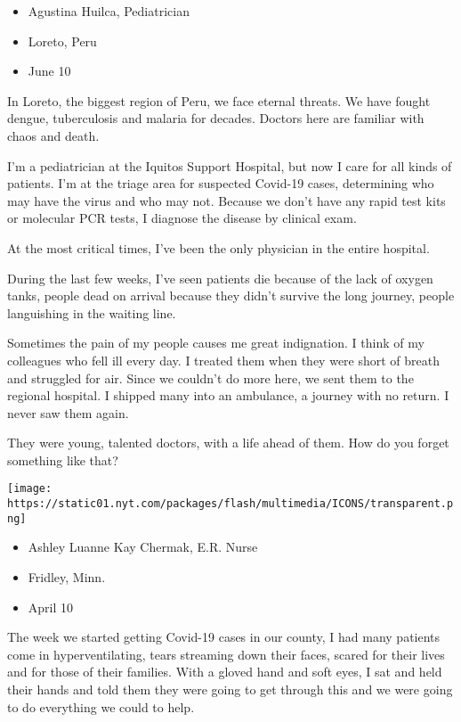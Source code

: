 \begin{itemize}
\tightlist
\item
  Agustina Huilca, Pediatrician
\item
  Loreto, Peru
\item
  June 10
\end{itemize}

In Loreto, the biggest region of Peru, we face eternal threats. We have
fought dengue, tuberculosis and malaria for decades. Doctors here are
familiar with chaos and death.

I'm a pediatrician at the Iquitos Support Hospital, but now I care for
all kinds of patients. I'm at the triage area for suspected Covid-19
cases, determining who may have the virus and who may not. Because we
don't have any rapid test kits or molecular PCR tests, I diagnose the
disease by clinical exam.

At the most critical times, I've been the only physician in the entire
hospital.

During the last few weeks, I've seen patients die because of the lack of
oxygen tanks, people dead on arrival because they didn't survive the
long journey, people languishing in the waiting line.

Sometimes the pain of my people causes me great indignation. I think of
my colleagues who fell ill every day. I treated them when they were
short of breath and struggled for air. Since we couldn't do more here,
we sent them to the regional hospital. I shipped many into an ambulance,
a journey with no return. I never saw them again.

They were young, talented doctors, with a life ahead of them. How do you
forget something like that?

\texttt{[image: https://static01.nyt.com/packages/flash/multimedia/ICONS/transparent.png]}

\begin{itemize}
\tightlist
\item
  Ashley Luanne Kay Chermak, E.R. Nurse
\item
  Fridley, Minn.
\item
  April 10
\end{itemize}

The week we started getting Covid-19 cases in our county, I had many
patients come in hyperventilating, tears streaming down their faces,
scared for their lives and for those of their families. With a gloved
hand and soft eyes, I sat and held their hands and told them they were
going to get through this and we were going to do everything we could to
help.

